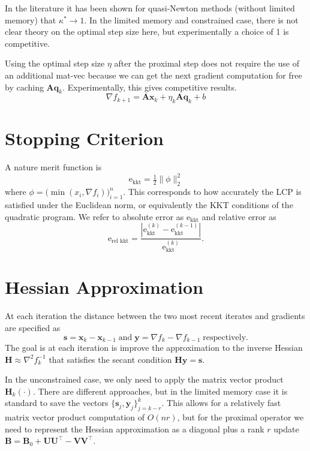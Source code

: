 \documentclass{article}
\newcommand{\x}{\mathbf{x}}
\newcommand{\q}{\mathbf{q}}
\newcommand{\A}{\mathbf{A}}
\newcommand{\V}{\mathbf{V}}
\newcommand{\s}{\mathbf{s}}
\newcommand{\y}{\mathbf{y}}
\renewcommand{\H}{\mathbf{H}}
\newcommand{\B}{\mathbf{B}}
\newcommand{\U}{\mathbf{U}}
\begin{document}
In the literature it has been shown for quasi-Newton methods (without limited memory) that $\kappa^* \rightarrow 1$. In the limited memory and constrained case, there is not clear theory on the optimal step size here, but experimentally a choice of 1 is competitive.

Using the optimal step size $\eta$ after the proximal step does not require the use of an additional mat-vec because we can get the next gradient computation for free by caching $\A\q_k$. Experimentally, this gives competitive results.
\[\nabla f_{k+1} = \A\x_k + \eta_k \A\q_k + b\] 
\section{Stopping Criterion}
A nature merit function is 
\begin{equation}\label{eq:stop-crit}
    \mathrm{e}_{\text{kkt}}=\tfrac{1}{2}\|\phi\|^2_2
\end{equation}
where $\phi = \bigl(\min(x_i, \nabla f_i)\bigr)_{i=1}^n$. This corresponds to how accurately the LCP is satisfied under the Euclidean norm, or equivalently the KKT conditions of the quadratic program. We refer to absolute error as $\mathrm{e}_{\text{kkt}}$ and relative error as
\[\mathrm{e}_{\text{rel kkt}} = \frac{\left|\mathrm{e}_{\text{kkt}}^{(k)} - \mathrm{e}_{\text{kkt}}^{(k-1)}\right|}  {\mathrm{e}_{\text{kkt}}^{(k)}}.\]


\section{Hessian Approximation}

At each iteration the distance between the two most recent iterates and gradients are specified as 
\[\s = \x_k - \x_{k-1} \;\mathrm{ and } \;\y = \nabla f_k - \nabla f_{k-1} \;\mathrm{respectively.}\]
The goal is at each iteration is improve the approximation to the inverse Hessian $\H \approx \nabla^2 f_k ^{-1}$ that satisfies the secant condition $\H \y = \s$.

In the unconstrained case, we only need to apply the matrix vector product $\H_k( \cdot)$. There are different approaches, but in the limited memory case it is standard to save the vectors $\{\s_j, \y_j\}_{j=k-r}^{k}$. This allows for a relatively fast matrix vector product computation of $O(n r)$, but for the proximal operator we need to represent the Hessian approximation as a diagonal plus a rank $r$ update $\B = \B_0 + \U\U^{\top} - \V\V^{\top}$. 
\end{document}

